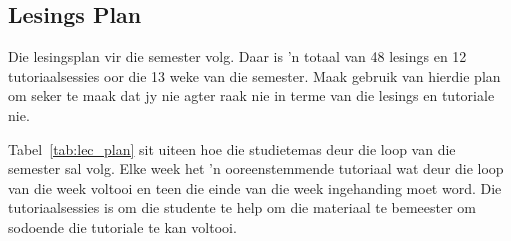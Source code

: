    \subsection{Lesings Plan}
        Die lesingsplan vir die semester volg.  Daar is 'n totaal van 48
        lesings en 12 tutoriaalsessies oor die 13 weke van die semester. Maak
        gebruik van hierdie plan om seker te maak dat jy nie agter raak nie in
        terme van die lesings en tutoriale nie.

        Tabel~\ref{tab:lec_plan} sit uiteen hoe die studietemas deur die loop
        van die semester sal volg.  Elke week het 'n ooreenstemmende tutoriaal
        wat deur die loop van die week voltooi en teen die	einde van die week
        ingehanding moet word. Die tutoriaalsessies is om die studente te help
        om die materiaal te bemeester om sodoende die tutoriale te kan voltooi.

